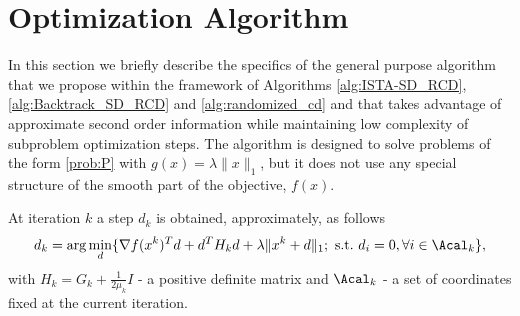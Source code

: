 \documentclass[11pt]{article}
\numberwithin{equation}{section}
\begin{document}
\section{Optimization Algorithm}
\label{sec:alg}

In this section we briefly describe the specifics of the general purpose algorithm that we propose within the framework of Algorithms 
\ref{alg:ISTA-SD_RCD}, \ref{alg:Backtrack_SD_RCD} and \ref{alg:randomized_cd} and that takes advantage of approximate second order information while maintaining low complexity of subproblem optimization steps.
The algorithm is designed to solve problems of the form \eqref{prob:P} with $g(x)=\lambda \|x\|_1$, but it does not use any special structure of the smooth part of the objective, $f(x)$.




 At iteration $k$ a step $d_k$  is obtained, approximately, as follows
\begin{equation}
    \label{equ:compute_d_outer_Ak}
    \nonumber d_k = \arg\min_{d} \{\nabla f(x^k)^T d + d^T H_k d + \lambda\|x^k + d\|_1; \ \mbox{s.t.}~ d_i = 0, \forall i \in \Acal_k\},
\end{equation}
with $H_k=G_k+\frac{1}{2\mu_k}I$ - a positive definite matrix  and $\Acal_k$ -  a set of coordinates fixed at the current iteration.
\end{document}
